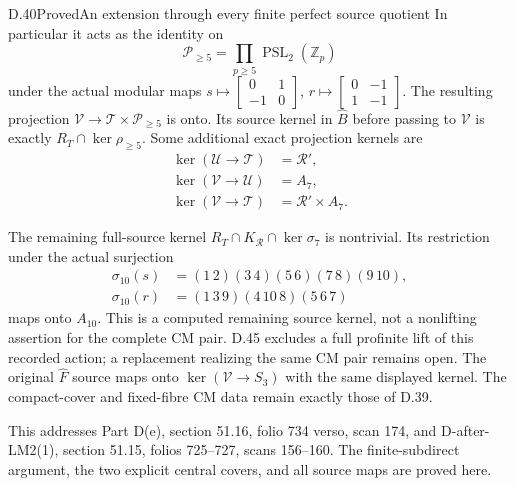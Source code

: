 \begin{statement}{D.40}{Proved}{An extension through every finite perfect source quotient}
In particular it acts as the identity on
\[
 \mathcal P_{\ge5}
    =\prod_{p\ge5}\operatorname{PSL}_2(\mathbb Z_p)        \tag{D.40.6}
\]
under the actual modular maps
$s\mapsto\left[\begin{smallmatrix}0&1\\-1&0\end{smallmatrix}\right]$,
$r\mapsto\left[\begin{smallmatrix}0&-1\\1&-1\end{smallmatrix}\right]$.
The resulting projection
$\mathcal V\to\mathcal T\times\mathcal P_{\ge5}$ is onto.
Its source kernel in $\widehat B$ before passing to
$\mathcal V$ is exactly $R_T\cap\ker\rho_{\ge5}$.
Some additional exact projection kernels are
\[
 \begin{split}
 \ker(\mathcal U\to\mathcal T)&=\mathcal R',\\
 \ker(\mathcal V\to\mathcal U)&=A_7,\\
 \ker(\mathcal V\to\mathcal T)&=\mathcal R'\times A_7.
 \end{split}                                             \tag{D.40.7}
\]

The remaining full-source kernel
$R_T\cap K_{\mathcal R}\cap\ker\sigma_7$ is nontrivial.
Its restriction under the actual surjection
\[
 \begin{split}
 \sigma_{10}(s)&=(1\,2)(3\,4)(5\,6)(7\,8)(9\,10),\\
 \sigma_{10}(r)&=(1\,3\,9)(4\,10\,8)(5\,6\,7)
 \end{split}                                             \tag{D.40.8}
\]
maps onto $A_{10}$. This is a computed remaining source
kernel, not a nonlifting assertion for the complete CM
pair. D.45 excludes a full profinite lift of this recorded
action; a replacement realizing the same CM pair remains open.
The original $\widehat F$ source maps onto
$\ker(\mathcal V\to S_3)$ with the same displayed kernel.
The compact-cover and fixed-fibre CM data remain exactly
those of D.39.

This addresses Part D(e), section 51.16, folio 734 verso,
scan 174, and D-after-LM2(1), section 51.15, folios
725--727, scans 156--160. The finite-subdirect argument,
the two explicit central covers, and all source maps
are proved here.
\end{statement}
